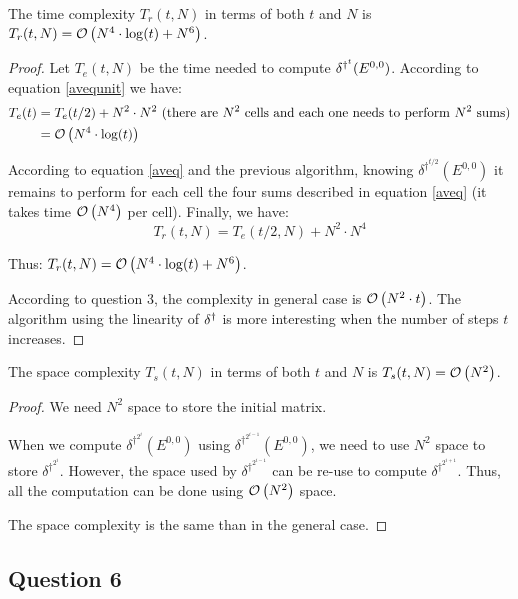 \begin{prop}
 The time complexity $T_r(t,N)$ in terms of both $t$ and $N$ is $T_r(t,N) = \mathcal O \left( N^4 \cdot \log(t) + N^6 \right)$.
\end{prop}

\begin{proof}
  Let $T_e(t,N)$ be the time needed to compute $\delta^{\dag^t}(E^{0,0})$. According to equation \ref{avequnit} we have:
 \[\begin{split}
    T_e(t) & = T_e(t/2) + N^2 \cdot N^2 \text{ (there are } N^2 \text{ cells and each one needs to perform } N^2 \text{ sums)} \\
         & = \mathcal O \left( N^4 \cdot \log(t) \right)
   \end{split}
\]  
  
  According to equation \ref{aveq} and the previous algorithm, knowing $\delta^{\dag^{t/2}}(E^{0,0})$ it remains to perform for each cell the four sums described in equation \ref{aveq} (it takes time $\mathcal O \left( N^4 \right)$ per cell). Finally, we have:
  \[ T_r(t,N) = T_e(t/2,N) + N^2 \cdot N^4\]
  
  Thus: $T_r(t,N) = \mathcal O \left( N^4 \cdot \log(t) + N^6 \right)$.
  
  According to question 3, the complexity in general case is $\mathcal O \left( N^2 \cdot t \right)$. The algorithm using the linearity of $\delta^{\dag}$ is more interesting when the number of steps $t$ increases.
\end{proof}

\begin{prop}
 The space complexity $T_s(t,N)$ in terms of both $t$ and $N$ is $T_s(t,N) = \mathcal O \left( N^2 \right)$.
\end{prop}

\begin{proof}
 We need $N^2$ space to store the initial matrix.

 When we compute $\delta^{\dag^{2^i}}(E^{0,0})$ using $\delta^{\dag^{2^{i-1}}}(E^{0,0})$, we need to use $N^2$ space to store $\delta^{\dag^{2^i}}$. However, the space used by $\delta^{\dag^{2^{i-1}}}$ can be re-use to compute $\delta^{\dag^{2^{i+1}}}$. Thus, all the computation can be done using $\mathcal O \left( N^2 \right)$ space.
 
 The space complexity is the same than in the general case.
\end{proof}


\subsection*{Question 6}

